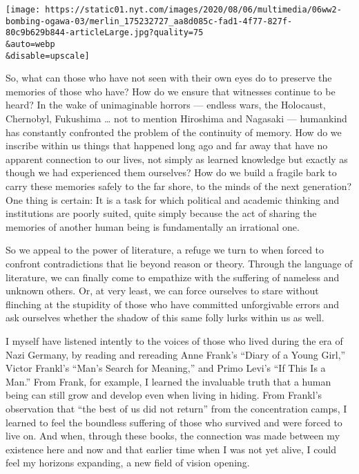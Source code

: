 \texttt{[image: https://static01.nyt.com/images/2020/08/06/multimedia/06ww2-bombing-ogawa-03/merlin\_175232727\_aa8d085c-fad1-4f77-827f-80c9b629b844-articleLarge.jpg?quality=75\\\&auto=webp\\\&disable=upscale]}

So, what can those who have not seen with their own eyes do to preserve
the memories of those who have? How do we ensure that witnesses continue
to be heard? In the wake of unimaginable horrors --- endless wars, the
Holocaust, Chernobyl, Fukushima \ldots{} not to mention Hiroshima and
Nagasaki --- humankind has constantly confronted the problem of the
continuity of memory. How do we inscribe within us things that happened
long ago and far away that have no apparent connection to our lives, not
simply as learned knowledge but exactly as though we had experienced
them ourselves? How do we build a fragile bark to carry these memories
safely to the far shore, to the minds of the next generation? One thing
is certain: It is a task for which political and academic thinking and
institutions are poorly suited, quite simply because the act of sharing
the memories of another human being is fundamentally an irrational one.

So we appeal to the power of literature, a refuge we turn to when forced
to confront contradictions that lie beyond reason or theory. Through the
language of literature, we can finally come to empathize with the
suffering of nameless and unknown others. Or, at very least, we can
force ourselves to stare without flinching at the stupidity of those who
have committed unforgivable errors and ask ourselves whether the shadow
of this same folly lurks within us as well.

I myself have listened intently to the voices of those who lived during
the era of Nazi Germany, by reading and rereading Anne Frank's ``Diary
of a Young Girl,'' Victor Frankl's ``Man's Search for Meaning,'' and
Primo Levi's ``If This Is a Man.'' From Frank, for example, I learned
the invaluable truth that a human being can still grow and develop even
when living in hiding. From Frankl's observation that ``the best of us
did not return'' from the concentration camps, I learned to feel the
boundless suffering of those who survived and were forced to live on.
And when, through these books, the connection was made between my
existence here and now and that earlier time when I was not yet alive, I
could feel my horizons expanding, a new field of vision opening.

